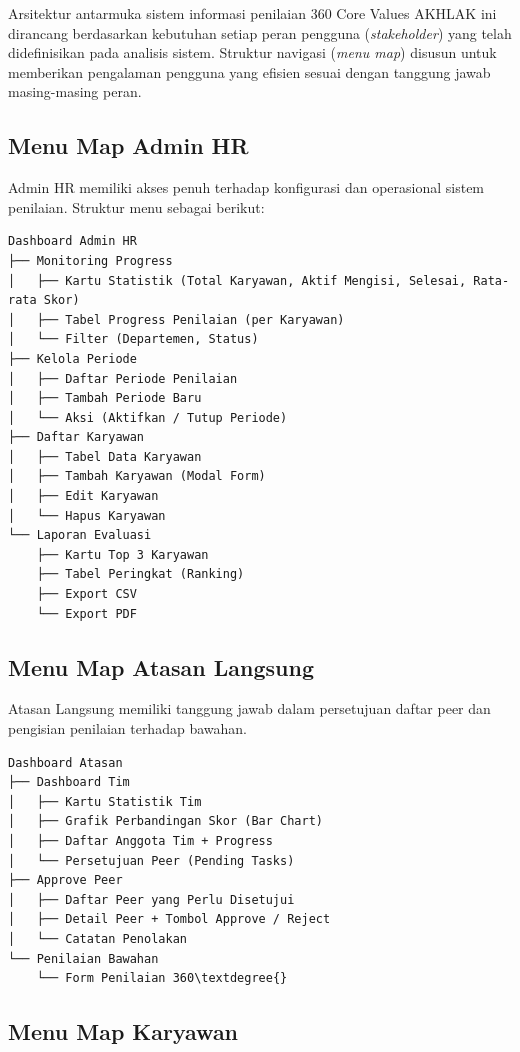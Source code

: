 \documentclass[12pt,a4paper,oneside]{report}
\begin{document}
Arsitektur antarmuka sistem informasi penilaian 360\textdegree{} Core Values AKHLAK ini dirancang berdasarkan kebutuhan setiap peran pengguna (\textit{stakeholder}) yang telah didefinisikan pada analisis sistem. Struktur navigasi (\textit{menu map}) disusun untuk memberikan pengalaman pengguna yang efisien sesuai dengan tanggung jawab masing-masing peran.

\subsection{Menu Map Admin HR}

Admin HR memiliki akses penuh terhadap konfigurasi dan operasional sistem penilaian. Struktur menu sebagai berikut:

\begin{verbatim}
Dashboard Admin HR
├── Monitoring Progress
│   ├── Kartu Statistik (Total Karyawan, Aktif Mengisi, Selesai, Rata-rata Skor)
│   ├── Tabel Progress Penilaian (per Karyawan)
│   └── Filter (Departemen, Status)
├── Kelola Periode
│   ├── Daftar Periode Penilaian
│   ├── Tambah Periode Baru
│   └── Aksi (Aktifkan / Tutup Periode)
├── Daftar Karyawan
│   ├── Tabel Data Karyawan
│   ├── Tambah Karyawan (Modal Form)
│   ├── Edit Karyawan
│   └── Hapus Karyawan
└── Laporan Evaluasi
    ├── Kartu Top 3 Karyawan
    ├── Tabel Peringkat (Ranking)
    ├── Export CSV
    └── Export PDF
\end{verbatim}

\subsection{Menu Map Atasan Langsung}

Atasan Langsung memiliki tanggung jawab dalam persetujuan daftar peer dan pengisian penilaian terhadap bawahan.

\begin{verbatim}
Dashboard Atasan
├── Dashboard Tim
│   ├── Kartu Statistik Tim
│   ├── Grafik Perbandingan Skor (Bar Chart)
│   ├── Daftar Anggota Tim + Progress
│   └── Persetujuan Peer (Pending Tasks)
├── Approve Peer
│   ├── Daftar Peer yang Perlu Disetujui
│   ├── Detail Peer + Tombol Approve / Reject
│   └── Catatan Penolakan
└── Penilaian Bawahan
    └── Form Penilaian 360\textdegree{}
\end{verbatim}

\subsection{Menu Map Karyawan}
\end{document}
